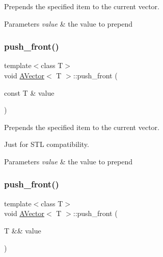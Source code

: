 Prepends the specified item to the current vector. 


\begin{DoxyParams}{Parameters}
{\em value} & the value to prepend \\
\hline
\end{DoxyParams}
\mbox{\label{class_a_vector_a18f64e22552d73fc4424dc81ba158216}} 
\subsubsection{\texorpdfstring{push\_front()}{push\_front()}\hspace{0.1cm}{\footnotesize\ttfamily [1/2]}}
{\footnotesize\ttfamily template$<$class T$>$ \\
void \mbox{\hyperlink{class_a_vector}{A\+Vector}}$<$ T $>$\+::push\+\_\+front (\begin{DoxyParamCaption}\item[{const T \&}]{value }\end{DoxyParamCaption})}



Prepends the specified item to the current vector. 

Just for S\+TL compatibility.


\begin{DoxyParams}{Parameters}
{\em value} & the value to prepend \\
\hline
\end{DoxyParams}
\mbox{\label{class_a_vector_a0050a46da378811f3ff5fc4df73ecd62}} 
\subsubsection{\texorpdfstring{push\_front()}{push\_front()}\hspace{0.1cm}{\footnotesize\ttfamily [2/2]}}
{\footnotesize\ttfamily template$<$class T$>$ \\
void \mbox{\hyperlink{class_a_vector}{A\+Vector}}$<$ T $>$\+::push\+\_\+front (\begin{DoxyParamCaption}\item[{T \&\&}]{value }\end{DoxyParamCaption})}



